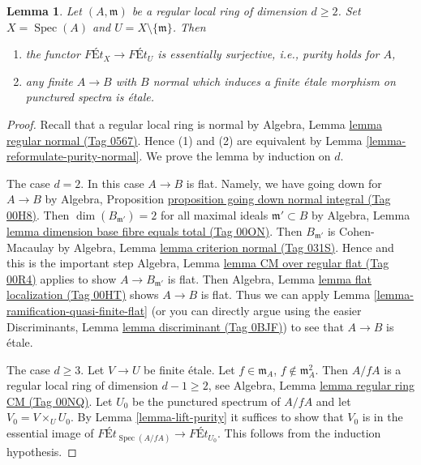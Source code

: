 \documentclass{amsart}
\theoremstyle{plain}
\newtheorem{lemma}[subsection]{Lemma}
\theoremstyle{definition}
\theoremstyle{remark}
\numberwithin{equation}{subsection}
\def\Spec{\mathop{\mathrm{Spec}}}
\begin{document}
\begin{lemma}
\label{lemma-local-purity}
Let $(A, \mathfrak m)$ be a regular local ring of dimension $d \geq 2$.
Set $X = \Spec(A)$ and $U = X \setminus \{\mathfrak m\}$. Then
\begin{enumerate}
\item the functor $\textit{F\'Et}_X \to \textit{F\'Et}_U$
is essentially surjective, i.e., purity holds for $A$,
\item any finite $A \to B$ with $B$ normal which
induces a finite \'etale morphism on punctured spectra is \'etale.
\end{enumerate}
\end{lemma}

\begin{proof}
Recall that a regular local ring is normal by
Algebra, Lemma \href{https://stacks.math.columbia.edu/tag/0567}{lemma regular normal (Tag 0567)}.
Hence (1) and (2) are equivalent by
Lemma \ref{lemma-reformulate-purity-normal}.
We prove the lemma by induction on $d$.

\medskip\noindent
The case $d = 2$. In this case $A \to B$ is flat.
Namely, we have going down for $A \to B$ by
Algebra, Proposition \href{https://stacks.math.columbia.edu/tag/00H8}{proposition going down normal integral (Tag 00H8)}.
Then $\dim(B_{\mathfrak m'}) = 2$ for all maximal ideals
$\mathfrak m' \subset B$ by
Algebra, Lemma \href{https://stacks.math.columbia.edu/tag/00ON}{lemma dimension base fibre equals total (Tag 00ON)}.
Then $B_{\mathfrak m'}$ is Cohen-Macaulay by
Algebra, Lemma \href{https://stacks.math.columbia.edu/tag/031S}{lemma criterion normal (Tag 031S)}.
Hence and this is the important step
Algebra, Lemma \href{https://stacks.math.columbia.edu/tag/00R4}{lemma CM over regular flat (Tag 00R4)}
applies to show $A \to B_{\mathfrak m'}$ is flat.
Then Algebra, Lemma \href{https://stacks.math.columbia.edu/tag/00HT}{lemma flat localization (Tag 00HT)}
shows $A \to B$ is flat. Thus we can apply
Lemma \ref{lemma-ramification-quasi-finite-flat}
(or you can directly argue using the easier
Discriminants, Lemma \href{https://stacks.math.columbia.edu/tag/0BJF}{lemma discriminant (Tag 0BJF)})
to see that $A \to B$ is \'etale.

\medskip\noindent
The case $d \geq 3$. Let $V \to U$ be finite \'etale.
Let $f \in \mathfrak m_A$, $f \not \in \mathfrak m_A^2$.
Then $A/fA$ is a regular local ring of dimension $d - 1 \geq 2$, see
Algebra, Lemma \href{https://stacks.math.columbia.edu/tag/00NQ}{lemma regular ring CM (Tag 00NQ)}.
Let $U_0$ be the punctured spectrum of $A/fA$ and let
$V_0 = V \times_U U_0$.
By Lemma \ref{lemma-lift-purity}
it suffices to show that $V_0$ is in the essential
image of $\textit{F\'Et}_{\Spec(A/fA)} \to \textit{F\'Et}_{U_0}$.
This follows from the induction hypothesis.
\end{proof}
\end{document}

